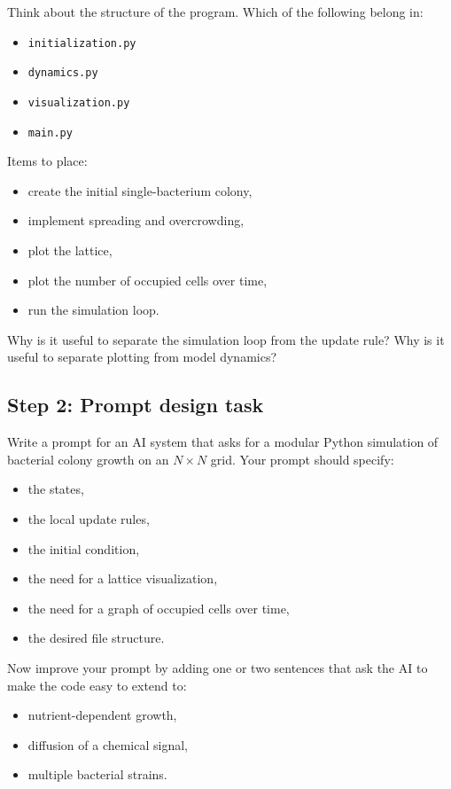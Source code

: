 \documentclass[paper=letter, fontsize=12pt]{article}
\numberwithin{equation}{section}
\begin{document}
\begin{taskbox}
Think about the structure of the program. Which of the following belong in:
\begin{itemize}
\item \texttt{initialization.py}
\item \texttt{dynamics.py}
\item \texttt{visualization.py}
\item \texttt{main.py}
\end{itemize}

\medskip
Items to place:
\begin{itemize}
\item create the initial single-bacterium colony,
\item implement spreading and overcrowding,
\item plot the lattice,
\item plot the number of occupied cells over time,
\item run the simulation loop.
\end{itemize}
\end{taskbox}

\begin{taskbox}
Why is it useful to separate the simulation loop from the update rule? Why is it useful to separate plotting from model dynamics?
\end{taskbox}

\subsection*{Step 2: Prompt design task}

\begin{aibox}
Write a prompt for an AI system that asks for a modular Python simulation of bacterial colony growth on an $N \times N$ grid. Your prompt should specify:
\begin{itemize}
\item the states,
\item the local update rules,
\item the initial condition,
\item the need for a lattice visualization,
\item the need for a graph of occupied cells over time,
\item the desired file structure.
\end{itemize}
\end{aibox}

\begin{aibox}
Now improve your prompt by adding one or two sentences that ask the AI to make the code easy to extend to:
\begin{itemize}
\item nutrient-dependent growth,
\item diffusion of a chemical signal,
\item multiple bacterial strains.
\end{itemize}
\end{aibox}
\end{document}
